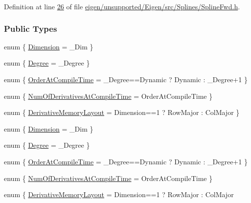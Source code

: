 Definition at line \hyperlink{eigen_2unsupported_2_eigen_2src_2_splines_2_spline_fwd_8h_source_l00026}{26} of file \hyperlink{eigen_2unsupported_2_eigen_2src_2_splines_2_spline_fwd_8h_source}{eigen/unsupported/\+Eigen/src/\+Splines/\+Spline\+Fwd.\+h}.

\subsubsection*{Public Types}
\begin{DoxyCompactItemize}
\item 
enum \{ \hyperlink{group___splines___module_a93e7c03e3ea8088794fd8207404c94d7adbafbfda2651866a881829e1aa7c918c}{Dimension} = \+\_\+\+Dim
 \}
\item 
enum \{ \hyperlink{group___splines___module_a2e06443a908d1ebf9cc91d4fa3fe5c5aaec1dae8e0ed3ac7304e02009d428330a}{Degree} = \+\_\+\+Degree
 \}
\item 
enum \{ \hyperlink{group___splines___module_a2b24a7becfc961a298d1b7dbd34a70f8a425367a45c96d6c51b8a454e96a0b0eb}{Order\+At\+Compile\+Time} = \+\_\+\+Degree==Dynamic ? Dynamic \+: \+\_\+\+Degree+1
 \}
\item 
enum \{ \hyperlink{group___splines___module_a2da1a11e7bf2abfbedea7df9b15d9895a88f260bd13254516bae0c12f70a12c75}{Num\+Of\+Derivatives\+At\+Compile\+Time} = Order\+At\+Compile\+Time
 \}
\item 
enum \{ \hyperlink{group___splines___module_ac19a27ac551b6dfe70931c532c3a8ba6a52424d4d61e31b347ef716c9bc70dd20}{Derivative\+Memory\+Layout} = Dimension==1 ? Row\+Major \+: Col\+Major
 \}
\item 
enum \{ \hyperlink{group___splines___module_a93e7c03e3ea8088794fd8207404c94d7adbafbfda2651866a881829e1aa7c918c}{Dimension} = \+\_\+\+Dim
 \}
\item 
enum \{ \hyperlink{group___splines___module_a2e06443a908d1ebf9cc91d4fa3fe5c5aaec1dae8e0ed3ac7304e02009d428330a}{Degree} = \+\_\+\+Degree
 \}
\item 
enum \{ \hyperlink{group___splines___module_a2b24a7becfc961a298d1b7dbd34a70f8a425367a45c96d6c51b8a454e96a0b0eb}{Order\+At\+Compile\+Time} = \+\_\+\+Degree==Dynamic ? Dynamic \+: \+\_\+\+Degree+1
 \}
\item 
enum \{ \hyperlink{group___splines___module_a2da1a11e7bf2abfbedea7df9b15d9895a88f260bd13254516bae0c12f70a12c75}{Num\+Of\+Derivatives\+At\+Compile\+Time} = Order\+At\+Compile\+Time
 \}
\item 
enum \{ \hyperlink{group___splines___module_ac19a27ac551b6dfe70931c532c3a8ba6a52424d4d61e31b347ef716c9bc70dd20}{Derivative\+Memory\+Layout} = Dimension==1 ? Row\+Major \+: Col\+Major

\end{DoxyCompactItemize}
